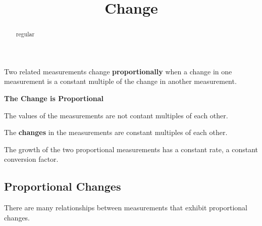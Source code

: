 \documentclass{ximera}
\title{Change}
\begin{document}
\begin{abstract}
regular
\end{abstract}
\maketitle


Two related measurements change \textbf{\textcolor{blue!55!black}{proportionally}} when a change in one measurement is a constant multiple of the change in another measurement. 



\begin{warning} \textbf{\textcolor{red!70!black}{The Change is Proportional}}

The values of the measurements are not contant multiples of each other. 


The \textbf{\textcolor{red!70!black}{changes}} in the measurements are constant multiples of each other.

\end{warning}


The growth of the two proportional measurements has a constant rate, a constant conversion factor. 





\subsection*{Proportional Changes}




There are many relationships between measurements that exhibit proportional changes.  
\end{document}
